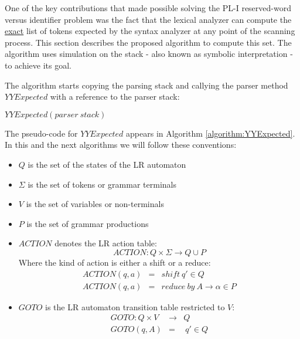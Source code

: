 One of the key contributions that made possible solving the PL-I
reserved-word versus identifier problem was 
the fact that the lexical analyzer can 
compute the \underline{exact} list of tokens 
expected by the syntax analyzer at any point of the scanning process.
This section describes the proposed  algorithm 
to compute this set. 
The algorithm uses simulation on the stack -
also known as symbolic interpretation - to achieve its goal.

The algorithm starts copying the parsing stack and callying the 
parser method $YYExpected$ with a reference to the parser stack:

\begin{algorithmic}
\STATE    $YYExpected(parser\ stack)$
\end{algorithmic}

The pseudo-code for $YYExpected$ appears in Algorithm
\ref{algorithm:YYExpected}. In this and the next algorithms 
we will follow these conventions:
\begin{itemize}
\item $Q$ is the set of the states of the LR automaton
\item $\Sigma$ is the set of tokens or grammar terminals
\item $V$ is the set of variables or non-terminals
\item $P$ is the set of grammar productions
\item $ACTION$ denotes the LR action table: 
\[ ACTION : Q \times \Sigma \rightarrow Q \cup P \]
Where the kind of action is either a shift or a reduce:
\begin{eqnarray*}
ACTION(q, a) &=& shift\ q' \in Q\\
ACTION(q, a) &=& reduce\ by\ A \rightarrow \alpha \in P
\end{eqnarray*}

\item $GOTO$ is the LR automaton transition table restricted
to $V$:
\begin{eqnarray*}
GOTO : Q \times V &\rightarrow& Q\\
GOTO(q, A) &=& \ q' \in Q\\
\end{eqnarray*}
\end{itemize}

